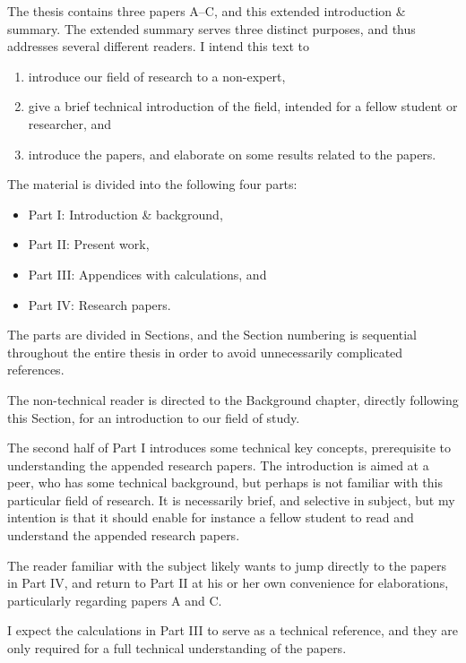 \documentclass[thesis.tex]{subfiles}
\begin{document}
The thesis contains three papers A--C, and this extended introduction \& summary. The extended summary serves three distinct purposes, and thus addresses several different readers. I intend this text to 
\begin{enumerate}
	\item introduce our field of research to a non-expert,
	\item give a brief technical introduction of the field, intended for a fellow student or researcher, and
	\item introduce the papers, and elaborate on some results related to the papers.
\end{enumerate}
The material is divided into the following four parts:
\begin{itemize}
	\item Part I: Introduction \& background,
	\item Part II: Present work,
	\item Part III: Appendices with calculations, and
	\item Part IV: Research papers.
\end{itemize}
The parts are divided in Sections, and the Section numbering is sequential throughout the entire thesis in order to avoid unnecessarily complicated references.

The non-technical reader is directed to the Background chapter, directly following this Section, for an introduction to our field of study. 

The second half of Part I introduces some technical key concepts, prerequisite to understanding the appended research papers. The introduction is aimed at a peer, who has some technical background, but perhaps is not familiar with this particular field of research. It is necessarily brief, and selective in subject, but my intention is that it should enable for instance a fellow student to read and understand the appended research papers.

The reader familiar with the subject likely wants to jump directly to the papers in Part IV, and return to Part II at his or her own convenience for elaborations, particularly regarding papers A and C.

I expect the calculations in Part III to serve as a technical reference, and they are only required for a full technical understanding of the papers.
\end{document}
